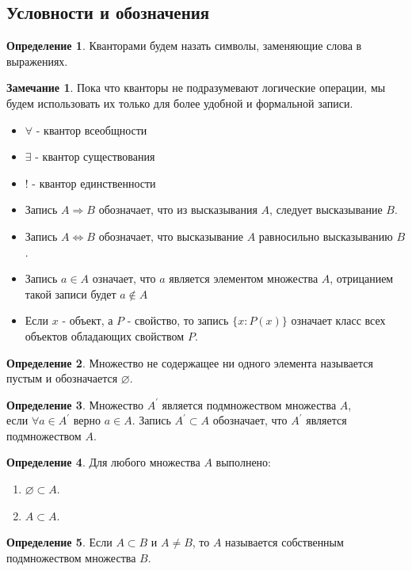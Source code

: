 \documentclass[a4paper, 12pt]{article}
\newcommand{\lra}{\Leftrightarrow}
\renewcommand{\emptyset}{\varnothing}
\theoremstyle{definition}
\newtheorem*{definition}{Определение}
\newtheorem*{comm}{Замечание}
\begin{document}
    \subsection{Условности и обозначения}
        \begin{definition}
            Кванторами будем назать символы, заменяющие слова в выражениях.
        \end{definition}
        \begin{comm}
            Пока что кванторы не подразумевают логические операции, мы будем использовать их только для более удобной и формальной записи.
        \end{comm}
        \begin{itemize}
            \item $\forall$ - квантор всеобщности
            \item $\exists$ - квантор существования
            \item $!$ - квантор единственности
            \item Запись $A \Rightarrow B$ обозначает, что из высказывания $A$, следует высказывание $B$. 
            \item Запись $A \lra B$ обозначает, что высказывание $A$ равносильно высказыванию $B$.
            \item Запись $a \in A$ означает, что $a$ является элементом множества $A$, отрицанием такой записи будет $a \notin A$
            \item Если $x$ - объект, а $P$ - свойство, то запись $\{x : P(x)\}$ означает класс всех объектов обладающих свойством $P$.
        \end{itemize}
        \begin{definition}
            Множество не содержащее ни одного элемента называется пустым и обозначается $\emptyset$.
        \end{definition}
        \begin{definition}
            Множество $A^{\prime}$ является подмножеством множества $A$, \\ если $\forall a\in A^{\prime}$ верно $a\in A$. Запись $A^{\prime} \subset A$ обозначает, что $A^{\prime}$ является подмножеством $A$.
        \end{definition}        
        \begin{definition}
            Для любого множества $A$ выполнено:
            \begin{enumerate}
                \item $\emptyset \subset A$.
                \item $A \subset A$.
            \end{enumerate}
        \end{definition}
        \begin{definition}
            Если $A\subset B$ и $A\ne B$, то $A$ называется собственным подмножеством множества $B$.
        \end{definition}
\end{document}
